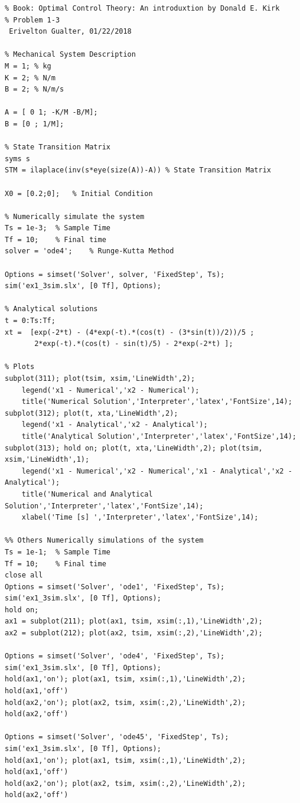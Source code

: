 \documentclass{article}
\begin{document}
\begin{lstlisting}
% Book: Optimal Control Theory: An introduxtion by Donald E. Kirk
% Problem 1-3
 Erivelton Gualter, 01/22/2018

% Mechanical System Description
M = 1; % kg
K = 2; % N/m
B = 2; % N/m/s

A = [ 0 1; -K/M -B/M];
B = [0 ; 1/M];

% State Transition Matrix
syms s
STM = ilaplace(inv(s*eye(size(A))-A)) % State Transition Matrix

X0 = [0.2;0];	% Initial Condition 

% Numerically simulate the system
Ts = 1e-3;  % Sample Time
Tf = 10;    % Final time
solver = 'ode4';    % Runge-Kutta Method

Options = simset('Solver', solver, 'FixedStep', Ts);
sim('ex1_3sim.slx', [0 Tf], Options);

% Analytical solutions
t = 0:Ts:Tf;
xt =  [exp(-2*t) - (4*exp(-t).*(cos(t) - (3*sin(t))/2))/5 ;
       2*exp(-t).*(cos(t) - sin(t)/5) - 2*exp(-2*t) ];

% Plots
subplot(311); plot(tsim, xsim,'LineWidth',2); 
    legend('x1 - Numerical','x2 - Numerical');
    title('Numerical Solution','Interpreter','latex','FontSize',14); 
subplot(312); plot(t, xta,'LineWidth',2); 
    legend('x1 - Analytical','x2 - Analytical'); 
    title('Analytical Solution','Interpreter','latex','FontSize',14); 
subplot(313); hold on; plot(t, xta,'LineWidth',2); plot(tsim, xsim,'LineWidth',1); 
    legend('x1 - Numerical','x2 - Numerical','x1 - Analytical','x2 - Analytical');
    title('Numerical and Analytical Solution','Interpreter','latex','FontSize',14); 
    xlabel('Time [s] ','Interpreter','latex','FontSize',14); 
    
%% Others Numerically simulations of the system
Ts = 1e-1;  % Sample Time
Tf = 10;    % Final time
close all
Options = simset('Solver', 'ode1', 'FixedStep', Ts);
sim('ex1_3sim.slx', [0 Tf], Options);
hold on;
ax1 = subplot(211); plot(ax1, tsim, xsim(:,1),'LineWidth',2); 
ax2 = subplot(212); plot(ax2, tsim, xsim(:,2),'LineWidth',2); 

Options = simset('Solver', 'ode4', 'FixedStep', Ts);
sim('ex1_3sim.slx', [0 Tf], Options);
hold(ax1,'on'); plot(ax1, tsim, xsim(:,1),'LineWidth',2); hold(ax1,'off')
hold(ax2,'on'); plot(ax2, tsim, xsim(:,2),'LineWidth',2); hold(ax2,'off')

Options = simset('Solver', 'ode45', 'FixedStep', Ts);
sim('ex1_3sim.slx', [0 Tf], Options);
hold(ax1,'on'); plot(ax1, tsim, xsim(:,1),'LineWidth',2); hold(ax1,'off')
hold(ax2,'on'); plot(ax2, tsim, xsim(:,2),'LineWidth',2); hold(ax2,'off')


\end{lstlisting}
\end{document}
